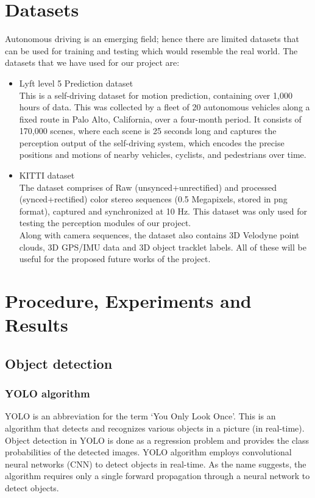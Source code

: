 \documentclass[conference]{IEEEtran}
\begin{document}
\section{Datasets}
Autonomous driving is an emerging field; hence there are limited datasets that can be used for training and testing which would resemble the real world. The datasets that we have used for our project are:
\begin{itemize}
  \item Lyft level 5 Prediction dataset \cite{ Lyft} \\
        This is a self-driving dataset for motion prediction, containing over 1,000 hours of data. This was collected by a fleet of 20 autonomous vehicles along a fixed route in Palo Alto, California, over a four-month period. It consists of 170,000 scenes, where each scene is 25 seconds long and captures the perception output of the self-driving system, which encodes the precise positions and motions of nearby vehicles, cyclists, and pedestrians over time.
  \item KITTI dataset \cite{KITTI} \\
        The dataset comprises of Raw (unsynced+unrectified) and processed (synced+rectified) color stereo sequences (0.5 Megapixels, stored in png format), captured and synchronized at 10 Hz. This dataset was only used for testing the perception modules of our project. \\
        Along with camera sequences, the dataset also contains 3D Velodyne point clouds, 3D GPS/IMU data and 3D object tracklet labels. All of these will be useful for the proposed future works of the project. \\
\end{itemize}
\section{Procedure, Experiments and Results}
\subsection{Object detection}
\subsubsection{\textbf{YOLO algorithm}}
YOLO is an abbreviation for the term ‘You Only Look Once’. This is an algorithm that detects and recognizes various objects in a picture (in real-time). Object detection in YOLO is done as a regression problem and provides the class probabilities of the detected images. YOLO algorithm employs convolutional neural networks (CNN) to detect objects in real-time. As the name suggests, the algorithm requires only a single forward propagation through a neural network to detect objects.
\end{document}
